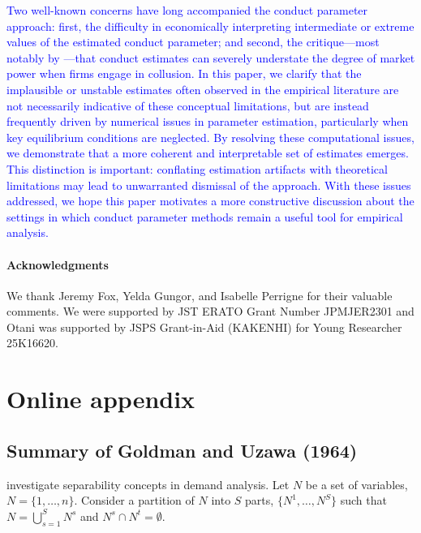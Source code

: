 \documentclass[11pt, a4paper]{article}
\theoremstyle{remark}
\begin{document}
\textcolor{blue}{Two well-known concerns have long accompanied the conduct parameter approach: first, the difficulty in economically interpreting intermediate or extreme values of the estimated conduct parameter; and second, the critique—most notably by \cite{corts1999conduct}—that conduct estimates can severely understate the degree of market power when firms engage in collusion. In this paper, we clarify that the implausible or unstable estimates often observed in the empirical literature are not necessarily indicative of these conceptual limitations, but are instead frequently driven by numerical issues in parameter estimation, particularly when key equilibrium conditions are neglected. By resolving these computational issues, we demonstrate that a more coherent and interpretable set of estimates emerges. This distinction is important: conflating estimation artifacts with theoretical limitations may lead to unwarranted dismissal of the approach. With these issues addressed, we hope this paper motivates a more constructive discussion about the settings in which conduct parameter methods remain a useful tool for empirical analysis.}


\paragraph{Acknowledgments}
We thank Jeremy Fox, Yelda Gungor, and Isabelle Perrigne for their valuable comments. %
We were supported by JST ERATO Grant Number JPMJER2301 and Otani was supported by JSPS Grant-in-Aid (KAKENHI) for Young Researcher 25K16620.

\newpage



\newpage
\appendix

\section{Online appendix}


\subsection{Summary of Goldman and Uzawa (1964)}\label{appendix:summary_goldman_uzawa}

\citet{goldmanNote1964} investigate separability concepts in demand analysis.
Let $N$ be a set of variables, $N = \{1,\ldots, n\}$.
Consider a partition of $N$ into $S$ parts, $\{N^1, \ldots, N^S\}$ such that $N = \bigcup_{s=1}^S N^s$ and $N^s \cap N^t = \emptyset$.
\end{document}
